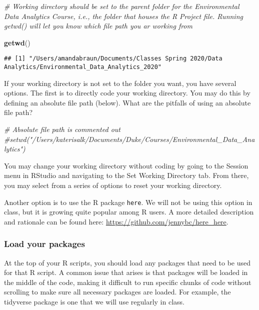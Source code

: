 \documentclass[]{article}
\newenvironment{Shaded}{\begin{snugshade}}{\end{snugshade}}
\newcommand{\CommentTok}[1]{\textcolor[rgb]{0.56,0.35,0.01}{\textit{#1}}}
\newcommand{\KeywordTok}[1]{\textcolor[rgb]{0.13,0.29,0.53}{\textbf{#1}}}
\newcommand{\NormalTok}[1]{#1}
\begin{document}
\begin{Shaded}
\begin{Highlighting}[]
\CommentTok{# Working directory should be set to the parent folder for the Environmental Data Analytics Course, i.e., the folder that houses the R Project file. Running getwd() will let you know which file path you ar working from}

\KeywordTok{getwd}\NormalTok{()}
\end{Highlighting}
\end{Shaded}

\begin{verbatim}
## [1] "/Users/amandabraun/Documents/Classes Spring 2020/Data Analytics/Environmental_Data_Analytics_2020"
\end{verbatim}

If your working directory is not set to the folder you want, you have
several options. The first is to directly code your working directory.
You may do this by defining an absolute file path (below). What are the
pitfalls of using an absolute file path?

\begin{Shaded}
\begin{Highlighting}[]
\CommentTok{# Absolute file path is commented out}
\CommentTok{#setwd("/Users/katerisalk/Documents/Duke/Courses/Environmental_Data_Analytics")}
\end{Highlighting}
\end{Shaded}

You may change your working directory without coding by going to the
Session menu in RStudio and navigating to the Set Working Directory tab.
From there, you may select from a series of options to reset your
working directory.

Another option is to use the R package \texttt{here}. We will not be
using this option in class, but it is growing quite popular among R
users. A more detailed description and rationale can be found here:
\url{https://github.com/jennybc/here_here}.

\hypertarget{load-your-packages}{%
\subsubsection{Load your packages}\label{load-your-packages}}

At the top of your R scripts, you should load any packages that need to
be used for that R script. A common issue that arises is that packages
will be loaded in the middle of the code, making it difficult to run
specific chunks of code without scrolling to make sure all necessary
packages are loaded. For example, the tidyverse package is one that we
will use regularly in class.
\end{document}
